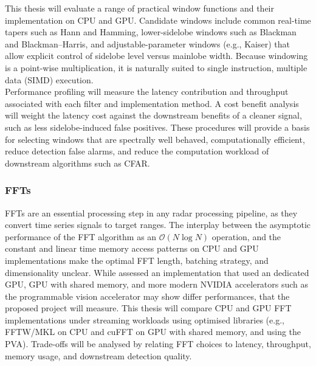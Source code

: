 This thesis will evaluate a range of practical window functions and their implementation on CPU and GPU. Candidate windows include common real-time tapers such as Hann and Hamming, lower-sidelobe windows such as Blackman and Blackman--Harris, and adjustable-parameter windows (e.g., Kaiser) that allow explicit control of sidelobe level versus mainlobe width. Because windowing is a point-wise multiplication, it is naturally suited to single instruction, multiple data (SIMD) execution. \\

Performance profiling will measure the latency contribution and throughput associated with each filter and implementation method. A cost benefit analysis will weight the latency cost against the downstream benefits of a cleaner signal, such as less sidelobe-induced false positives. These procedures will provide a basis for selecting windows that are spectrally well behaved, computationally efficient, reduce detection false alarms, and reduce the computation workload of downstream algorithms such as CFAR.

\subsubsection{FFTs}
FFTs are an essential processing step in any radar processing pipeline, as they convert time series signals to target ranges. The interplay between the asymptotic performance of the FFT algorithm as an \(\mathcal{O}(N\log N)\) operation, and the constant and linear time memory access patterns on CPU and GPU implementations make the optimal FFT length, batching strategy, and dimensionality unclear. While \cite{zaknoun2024_gpu_radar} assessed an implementation that used an dedicated GPU, GPU with shared memory, and more modern NVIDIA accelerators such as the programmable vision accelerator may show differ performances, that the proposed project will measure. This thesis will compare CPU and GPU FFT implementations under streaming workloads using optimised libraries (e.g., FFTW/MKL on CPU and cuFFT on GPU with shared memory, and using the PVA). Trade-offs will be analysed by relating FFT choices to latency, throughput, memory usage, and downstream detection quality.

